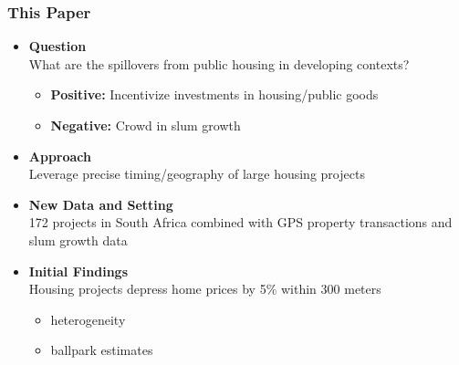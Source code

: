 \documentclass[aspectratio=149]{beamer}
\begin{document}

\begin{frame}
\frametitle{This Paper}

\begin{itemize}
  \item \textbf{Question} \\ 
  \vspace{.1cm}
  What are the spillovers from public housing in developing contexts?
  \vspace{.1cm}
    \begin{itemize}
      \item \textbf{Positive:} Incentivize investments in housing/public goods
      \item \textbf{Negative:} Crowd in slum growth
    \end{itemize}

\pause
\vspace{1mm}
\item \textbf{Approach} \\ Leverage precise timing/geography of large housing projects
\vspace{1mm}
\item \textbf{New Data and Setting} \\ 172 projects in South Africa combined with GPS property transactions and slum growth data
\vspace{1mm}
\item \textbf{Initial Findings} \\ Housing projects depress home prices by 5\% within 300 meters
\begin{itemize}
  \item heterogeneity
  \item ballpark estimates
\end{itemize}
\end{itemize}

\end{frame}


\end{document}
